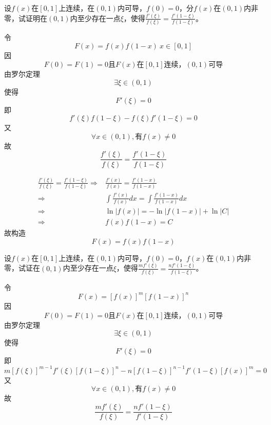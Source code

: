 \begin{example}
	设$f(x)$在$[0,1]$上连续，在$(0,1)$内可导，$f(0)=0$，$分f(x)$在$(0,1)$内非零，试证明在$(0,1)$内至少存在一点$\xi$，使得$\frac{f'(\xi)}{f(\xi)}=\frac{f'(1-\xi)}{f(1-\xi)}$。
\end{example}
	\begin{newproof}
		令\[F\left( x \right) =f\left( x \right) f\left( 1-x \right) \ x\in \left[ 0,1 \right] \]
		因\[F\left( 0 \right) =F\left( 1 \right) =0\text{且}F\left( x \right) \text{在}\left[ 0,1 \right] \text{连续，}\left( 0,1 \right) \text{可导}\]
		由罗尔定理\[\exists \xi \in \left( 0,1 \right) \]
		使得\[F'\left( \xi \right) =0\]
		即\[f'\left( \xi \right) f\left( 1-\xi \right) -f\left( \xi \right) f'\left( 1-\xi \right) =0\]
		又\[\forall x\in \left( 0,1 \right) ,\text{有}f\left( x \right) \ne 0\]
		故\[\frac{f'\left( \xi \right)}{f\left( \xi \right)}=\frac{f'\left( 1-\xi \right)}{f\left( 1-\xi \right)}\]
	\end{newproof}
	\begin{note}
		\begin{align*}
			\frac{f'\left( \xi \right)}{f\left( \xi \right)}=\frac{f'\left( 1-\xi \right)}{f\left( 1-\xi \right)}
			\Longrightarrow {}&
			\frac{f'\left( x \right)}{f\left( x \right)}=\frac{f'\left( 1-x \right)}{f\left( 1-x \right)}\\
			\Longrightarrow {}&
			\int{\frac{f'\left( x \right)}{f\left( x \right)}}dx=\int{\frac{f'\left( 1-x \right)}{f\left( 1-x \right)}}dx\\
			\Longrightarrow {}&
			\ln \left| f\left( x \right) \right|=-\ln \left| f\left( 1-x \right) \right|+\ln \left| C \right|\\
			\Longrightarrow {}&
			f\left( x \right) f\left( 1-x \right) =C
		\end{align*}
		故构造\[F(x) = f\left( x \right) f\left( 1-x \right)\]
	\end{note}

\begin{example}
	设$f(x)$在$[0,1]$上连续，在$(0,1)$内可导，$f(0)=0$，$f(x)$在$(0,1)$内非零，试证在$(0,1)$内至少存在一点$\xi$，使得$\frac{mf'(\xi)}{f(\xi)}=\frac{nf'(1-\xi)}{f(1-\xi)}$。
\end{example}
	\begin{newproof}
		令\[F\left( x \right) =\left[ f\left( x \right) \right] ^m\left[ f\left( 1-x \right) \right] ^n\]
		因\[F\left( 0 \right) =F\left( 1 \right) =0\text{且}F\left( x \right) \text{在}\left[ 0,1 \right] \text{连续，}\left( 0,1 \right) \text{可导}\]
		由罗尔定理\[\exists \xi \in \left( 0,1 \right) \]
		使得\[F'\left( \xi \right) =0\]
		即\[m\left[ f\left( \xi \right) \right] ^{m-1}f'\left( \xi \right) \left[ f\left( 1-\xi \right) \right] ^n-n\left[ f\left( 1-\xi \right) \right] ^{n-1}f'\left( 1-\xi \right) \left[ f\left( x \right) \right] ^m=0\]
		又\[\forall x\in \left( 0,1 \right) ,\text{有}f\left( x \right) \ne 0\]
		故\[\frac{mf'\left( \xi \right)}{f\left( \xi \right)}=\frac{nf'\left( 1-\xi \right)}{f'\left( 1-\xi \right)}\]
	\end{newproof}

